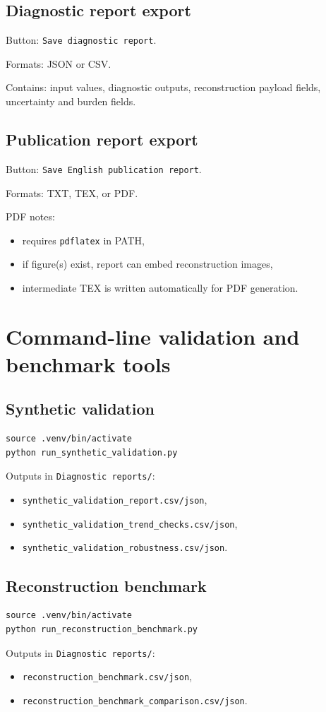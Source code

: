 \documentclass[12pt,a4paper]{article}
\begin{document}
\subsection{Diagnostic report export}
Button: \texttt{Save diagnostic report}.

Formats: JSON or CSV.

Contains: input values, diagnostic outputs, reconstruction payload fields, uncertainty and burden fields.

\subsection{Publication report export}
Button: \texttt{Save English publication report}.

Formats: TXT, TEX, or PDF.

PDF notes:
\begin{itemize}
    \item requires \texttt{pdflatex} in PATH,
    \item if figure(s) exist, report can embed reconstruction images,
    \item intermediate TEX is written automatically for PDF generation.
\end{itemize}

\section{Command-line validation and benchmark tools}
\subsection{Synthetic validation}
\begin{verbatim}
source .venv/bin/activate
python run_synthetic_validation.py
\end{verbatim}
Outputs in \texttt{Diagnostic reports/}:
\begin{itemize}
    \item \texttt{synthetic\_validation\_report.csv/json},
    \item \texttt{synthetic\_validation\_trend\_checks.csv/json},
    \item \texttt{synthetic\_validation\_robustness.csv/json}.
\end{itemize}

\subsection{Reconstruction benchmark}
\begin{verbatim}
source .venv/bin/activate
python run_reconstruction_benchmark.py
\end{verbatim}
Outputs in \texttt{Diagnostic reports/}:
\begin{itemize}
    \item \texttt{reconstruction\_benchmark.csv/json},
    \item \texttt{reconstruction\_benchmark\_comparison.csv/json}.
\end{itemize}
\end{document}
